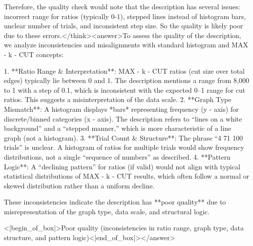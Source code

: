 Therefore, the quality check would note that the description has several issues: incorrect range for ratios (typically 0-1), stepped lines instead of histogram bars, unclear number of trials, and inconsistent step size. So the quality is likely poor due to these errors.</think><answer>To assess the quality of the description, we analyze inconsistencies and misalignments with standard histogram and MAX - k - CUT concepts:  

1. **Ratio Range & Interpretation**: MAX - k - CUT ratios (cut size over total edges) typically lie between 0 and 1. The description mentions a range from 8,000 to 1 with a step of 0.1, which is inconsistent with the expected 0–1 range for cut ratios. This suggests a misinterpretation of the data scale.  
2. **Graph Type Mismatch**: A histogram displays *bars* representing frequency (y - axis) for discrete/binned categories (x - axis). The description refers to “lines on a white background” and a “stepped manner,” which is more characteristic of a line graph (not a histogram).  
3. **Trial Count & Structure**: The phrase “4 71 100 trials” is unclear. A histogram of ratios for multiple trials would show frequency distributions, not a single “sequence of numbers” as described.  
4. **Pattern Logic**: A “declining pattern” for ratios (if valid) would not align with typical statistical distributions of MAX - k - CUT results, which often follow a normal or skewed distribution rather than a uniform decline.  


These inconsistencies indicate the description has **poor quality** due to misrepresentation of the graph type, data scale, and structural logic.  

<|begin_of_box|>Poor quality (inconsistencies in ratio range, graph type, data structure, and pattern logic)<|end_of_box|></answer>